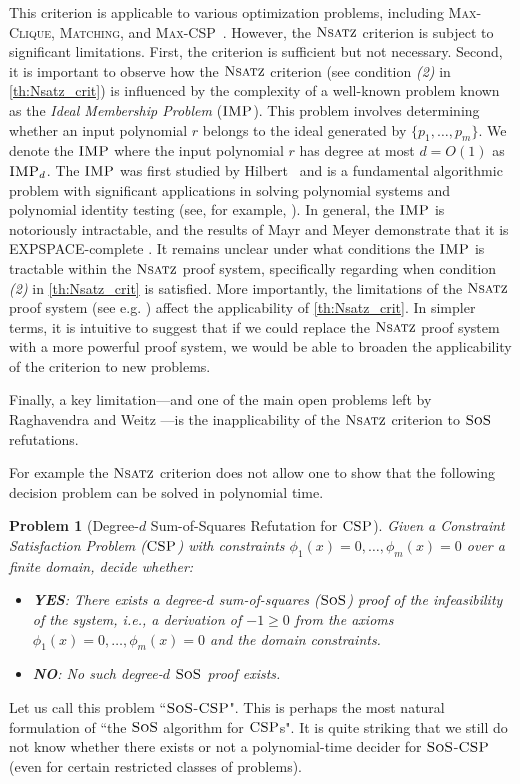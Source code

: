 \documentclass[11pt]{article}
\newcommand{\sos}{\text{\sc{SoS}}}
\newcommand{\CSP}{\textsc{CSP}}
\newcommand{\IMP}{\textsc{IMP}}
\newcommand{\Nsatz}{\textsc{Nsatz}}
\newcommand{\1}{\textbf{1}}
\newtheorem{problem}[theorem]{Problem}
\begin{document}
This criterion is applicable to various optimization problems, including \textsc{Max-Clique}, \textsc{Matching}, and \textsc{Max-CSP}~\cite{raghavendra_weitz2017}. 
However, the \(\Nsatz\) criterion is subject to significant limitations. First, the criterion is sufficient but not necessary.
Second, it is important to observe how the $\Nsatz$ criterion (see condition \textit{(2)} in \cref{th:Nsatz_crit}) is influenced by the complexity of a well-known problem known as the \emph{Ideal Membership Problem} (\(\IMP\)). This problem involves determining whether an input polynomial \(r\) belongs to the ideal generated by \(\{p_1, \ldots, p_m\}\). We denote the \(\IMP\) where the input polynomial \(r\) has degree at most \(d=O(1)\) as \(\IMP_d\). The \(\IMP\) was first studied by Hilbert~\cite{Hilbert1893} and is a fundamental algorithmic problem with significant applications in solving polynomial systems and polynomial identity testing (see, for example, \cite{Cox}). In general, the \(\IMP\) is notoriously intractable, and the results of Mayr and Meyer demonstrate that it is EXPSPACE-complete \cite{Mayr1989, MAYR1982305}.
It remains unclear under what conditions the \(\IMP\) is tractable within the \(\Nsatz\) proof system, specifically regarding when condition \textit{(2)} in \cref{th:Nsatz_crit} is satisfied. More importantly, the limitations of the \(\Nsatz\) proof system (see e.g. \cite{FlemingKothariPitassi19}) affect the applicability of \cref{th:Nsatz_crit}. 
In simpler terms, it is intuitive to suggest that if we could replace the \(\Nsatz\) proof system with a more powerful proof system, we would be able to broaden the applicability of the criterion to new problems.


Finally, a key limitation—and one of the main open problems left by Raghavendra and Weitz \cite{raghavendra_weitz2017, Weitz:Phd}—is the inapplicability of the $\Nsatz$ criterion to \(\sos\) refutations.


For example the $\Nsatz$ criterion does not allow one to show that the following decision problem can be solved in polynomial time. 

\begin{problem}[Degree-$d$ Sum-of-Squares Refutation for $\CSP$]\label{prob:sos-csp}
Given a Constraint Satisfaction Problem (\(\CSP\)) with constraints \(\phi_1(x) = 0, \dots, \phi_m(x) = 0\) over a finite domain, decide whether:
\begin{itemize}
    \item \textbf{YES}: There exists a degree-\(d\) sum-of-squares (\(\sos\)) proof of the infeasibility of the system, i.e., a derivation of \(-1 \geq 0\) from the axioms \(\phi_1(x) = 0, \dots, \phi_m(x) = 0\) and the domain constraints.
    \item \textbf{NO}: No such degree-\(d\) \(\sos\) proof exists.
\end{itemize}
\end{problem}
Let us call this problem ``$\sos$-$\CSP$". This is perhaps the most natural formulation of ``the $\sos$ algorithm for $\CSP$s". 
It is quite striking that we still do not know whether there exists or not a polynomial-time decider for $\sos$-$\CSP$ (even for certain restricted classes of problems).
\end{document}
